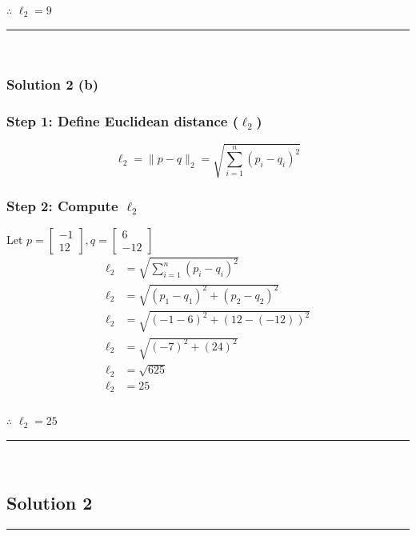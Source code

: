 \documentclass{article}
\begin{document}
\subsubsection*{\normalfont}{$\therefore$ $\ell_{2} = 9$}

\noindent\rule{\textwidth}{0.4pt}\\

\subsubsection*{Solution 2 (b)}
\subsubsection*{Step 1: Define Euclidean distance ($\ell_2$)}
\parbox{\textwidth}{

$$\ell_2 = \|p - q\|_2 = \sqrt{\sum_{i=1}^{n} (p_i - q_i)^2}$$

}

\subsubsection*{Step 2: Compute $\ell_2$}
\parbox{\textwidth}{
Let $p = \begin{bmatrix} -1 \\ 12 \end{bmatrix}, q = \begin{bmatrix} 6 \\ -12 \end{bmatrix}$
$$
\begin{aligned}
\ell_2 &= \sqrt{\sum_{i=1}^{n} (p_i - q_i)^2}\\
\ell_2 &= \sqrt{(p_1 - q_1)^{2}+(p_2 - q_2)^{2}}\\
\ell_2 &= \sqrt{(-1 - 6)^{2}+(12 - (-12))^{2}}\\
\ell_2 &= \sqrt{(-7)^{2}+(24)^{2}}\\
\ell_2 &= \sqrt{625}\\
\ell_2 &= 25
\end{aligned}
$$
}
\subsubsection*{\normalfont}{$\therefore$ $\ell_{2} = 25$}

\noindent\rule{\textwidth}{0.4pt}\\


\subsection*{Solution 2}
\noindent\rule{\textwidth}{0.4pt}\\
\end{document}
